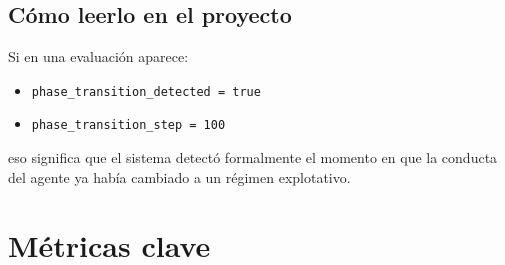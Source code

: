 \documentclass[11pt]{article}
\begin{document}
\subsection{Cómo leerlo en el proyecto}
Si en una evaluación aparece:
\begin{itemize}
    \item \texttt{phase\_transition\_detected = true}
    \item \texttt{phase\_transition\_step = 100}
\end{itemize}
eso significa que el sistema detectó formalmente el momento en que la conducta del agente ya había cambiado a un régimen explotativo.

\section{Métricas clave}
\end{document}
